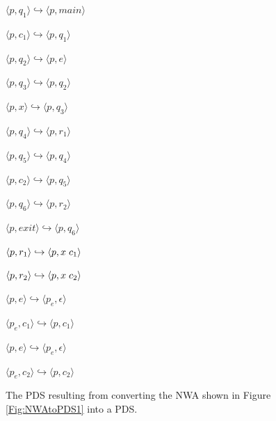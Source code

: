 \begin{figure}[htbp]
  \centering
    \begin{description}
      \centering
      \item $\langle p,q_1 \rangle \hookrightarrow \langle p,main \rangle$
      \item $\langle p,c_1 \rangle \hookrightarrow \langle p,q_1 \rangle$
      \item $\langle p,q_2 \rangle \hookrightarrow \langle p,e \rangle$
      \item $\langle p,q_3 \rangle \hookrightarrow \langle p,q_2 \rangle$
      \item $\langle p,x \rangle \hookrightarrow \langle p,q_3 \rangle$
      \item $\langle p,q_4 \rangle \hookrightarrow \langle p,r_1 \rangle$
      \item $\langle p,q_5 \rangle \hookrightarrow \langle p,q_4 \rangle$
      \item $\langle p,c_2 \rangle \hookrightarrow \langle p,q_5 \rangle$
      \item $\langle p,q_6 \rangle \hookrightarrow \langle p,r_2 \rangle$
      \item $\langle p,exit \rangle \hookrightarrow \langle p,q_6 \rangle$
      \item $\langle p,r_1 \rangle \hookrightarrow \langle p,x \hspace{.1cm} c_1 \rangle$
      \item $\langle p,r_2 \rangle \hookrightarrow \langle p,x \hspace{.1cm} c_2 \rangle$
      \item $\langle p,e \rangle \hookrightarrow \langle p_e, \epsilon \rangle$
      \item $\langle p_e,c_1 \rangle \hookrightarrow \langle p,c_1 \rangle$
      \item $\langle p,e \rangle \hookrightarrow \langle p_e, \epsilon \rangle$
      \item $\langle p_e,c_2 \rangle \hookrightarrow \langle p,c_2 \rangle$
    \end{description}
  \caption{The PDS resulting from converting the NWA shown in Figure
    \ref{Fig:NWAtoPDS1} into a PDS.}
  \label{Fig:NWAtoPDS3}
\end{figure}


